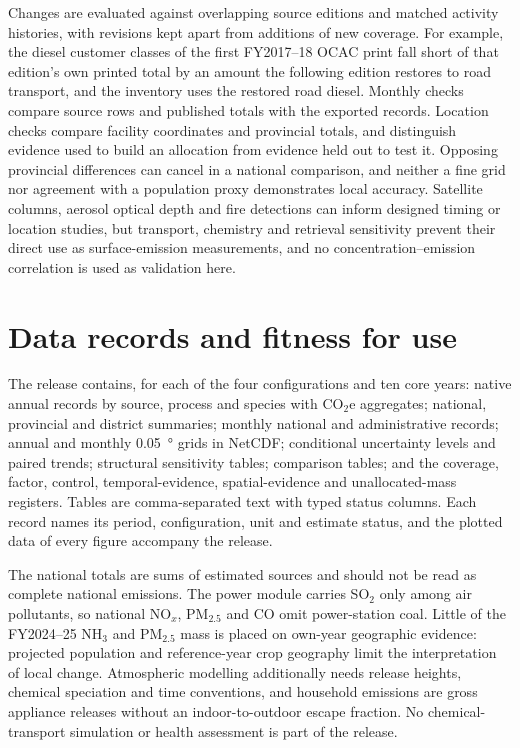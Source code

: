 \documentclass[essd,manuscript]{copernicus}
\begin{document}
Changes are evaluated against overlapping source editions and matched activity histories, with revisions kept apart from additions of new coverage. For example, the diesel customer classes of the first FY2017--18 OCAC print fall short of that edition's own printed total by an amount the following edition restores to road transport, and the inventory uses the restored road diesel. Monthly checks compare source rows and published totals with the exported records. Location checks compare facility coordinates and provincial totals, and distinguish evidence used to build an allocation from evidence held out to test it. Opposing provincial differences can cancel in a national comparison, and neither a fine grid nor agreement with a population proxy demonstrates local accuracy. Satellite columns, aerosol optical depth and fire detections can inform designed timing or location studies, but transport, chemistry and retrieval sensitivity prevent their direct use as surface-emission measurements, and no concentration--emission correlation is used as validation here.

\section{Data records and fitness for use}
\label{sec:data}
The release contains, for each of the four configurations and ten core years: native annual records by source, process and species with CO$_2$e aggregates; national, provincial and district summaries; monthly national and administrative records; annual and monthly \SI{0.05}{\degree} grids in NetCDF; conditional uncertainty levels and paired trends; structural sensitivity tables; comparison tables; and the coverage, factor, control, temporal-evidence, spatial-evidence and unallocated-mass registers. Tables are comma-separated text with typed status columns. Each record names its period, configuration, unit and estimate status, and the plotted data of every figure accompany the release.

The national totals are sums of estimated sources and should not be read as complete national emissions. The power module carries SO$_2$ only among air pollutants, so national NO$_x$, PM$_{2.5}$ and CO omit power-station coal. Little of the FY2024--25 NH$_3$ and PM$_{2.5}$ mass is placed on own-year geographic evidence: projected population and reference-year crop geography limit the interpretation of local change. Atmospheric modelling additionally needs release heights, chemical speciation and time conventions, and household emissions are gross appliance releases without an indoor-to-outdoor escape fraction. No chemical-transport simulation or health assessment is part of the release.
\end{document}
